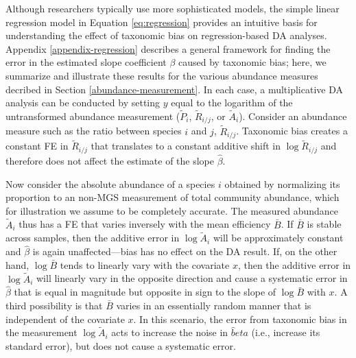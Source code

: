 \documentclass[
]{article}
\begin{document}
Although researchers typically use more sophisticated models, the simple linear regression model in Equation \eqref{eq:regression} provides an intuitive basis for understanding the effect of taxonomic bias on regression-based DA analyses.
Appendix \ref{appendix-regression} describes a general framework for finding the error in the estimated slope coefficient \(\beta\) caused by taxonomic bias; here, we summarize and illustrate these results for the various abundance measures decribed in Section \ref{abundance-measurement}.
In each case, a multiplicative DA analysis can be conducted by setting \(y\) equal to the logarithm of the untransformed abundance measurement (\(\tilde P_i\), \(\tilde R_{i/j}\), or \(\tilde A_i\)).
Consider an abundance measure such as the ratio between species \(i\) and \(j\), \(\tilde R_{i/j}\).
Taxonomic bias creates a constant FE in \(\tilde R_{i/j}\) that translates to a constant additive shift in \(\log \tilde R_{i/j}\) and therefore does not affect the estimate of the slope \(\hat \beta\).

Now consider the absolute abundance of a species \(i\) obtained by normalizing its proportion to an non-MGS measurement of total community abundance, which for illustration we assume to be completely accurate.
The measured abundance \(\tilde A_i\) thus has a FE that varies inversely with the mean efficiency \(\bar B\).
If \(\bar B\) is stable across samples, then the additive error in \(\log \tilde A_i\) will be approximately constant and \(\hat \beta\) is again unaffected---bias has no effect on the DA result.
If, on the other hand, \(\log \bar B\) tends to linearly vary with the covariate \(x\), then the additive error in \(\log \tilde A_i\) will linearly vary in the opposite direction and cause a systematic error in \(\hat \beta\) that is equal in magnitude but opposite in sign to the slope of \(\log \bar B\) with \(x\).
A third possibility is that \(\bar B\) varies in an essentially random manner that is independent of the covariate \(x\).
In this scenario, the error from taxonomic bias in the measurement \(\log \tilde A_{i}\) acts to increase the noise in \(\hat beta\) (i.e., increase its standard error), but does not cause a systematic error.
\end{document}
